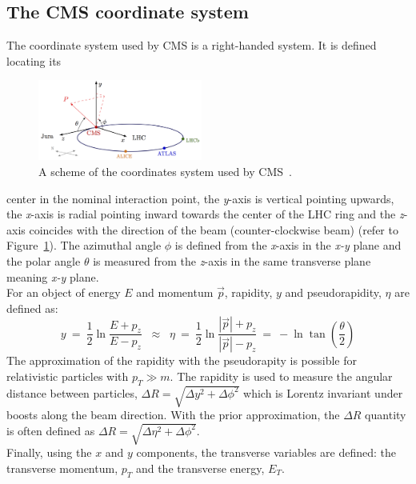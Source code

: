 \subsection{The CMS coordinate system} 
The coordinate system used by CMS is a right-handed system. It is defined
locating its 
\begin{figure}
  \begin{center}
    \includegraphics[clip,trim=0cm 0cm 0cm 0.1cm, width=0.48\textwidth]{Figures/c2/cms_coordinate_system.png}
  \end{center}
  \caption{A scheme of the coordinates system used by CMS~\cite{coordinate_cms}.}
\label{fig:coordinates}
\end{figure}
 center in the nominal interaction point, the
\emph{y}-axis is vertical pointing upwards, the \emph{x}-axis is
radial pointing inward towards the center of the LHC ring and the
\emph{z}-axis coincides with the direction of the beam
(counter-clockwise beam) (refer to
Figure~\ref{fig:coordinates}). The azimuthal angle $\phi$ is defined
from the \emph{x}-axis in the \emph{x-y} plane and the polar angle
$\theta$ is measured from the \emph{z}-axis in the same transverse
plane meaning \emph{x-y} plane.\\
For an object of energy $E$ and momentum $\overrightarrow{p}$,
rapidity, $y$ and pseudorapidity, $\eta$ are defined as:
\begin{equation}
\label{eq:pseudo}
y \: = \: \frac{1}{2} \ln \frac{E + p_z}{E - p_z} \;\; \approx \;\;
\eta \: = \: \frac{1}{2} \ln \frac{|\overrightarrow{p}| +
  p_z}{|\overrightarrow{p}| - p_z} \: = \: -\ln \tan (\frac{\theta}{2})
\end{equation}
The approximation of the rapidity with the pseudorapity is possible for
relativistic particles with $p_{T} \gg m$. The rapidity is used to
measure the angular distance between particles, $\Delta R =
\sqrt{\Delta y ^2 + \Delta \phi ^2}$ which is Lorentz invariant under
boosts along the beam direction. With the prior approximation,
the $\Delta R$ quantity is often defined as $\Delta R =
\sqrt{\Delta \eta ^2 + \Delta \phi ^2}$.\\
Finally, using the $x$ and $y$ components, the transverse variables
are defined: the transverse momentum, $p_T$ and the transverse energy,
$E_T$.\\

